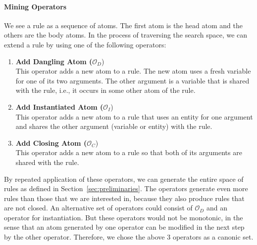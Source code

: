 {{\paragraph{Mining Operators}
We see a rule as a sequence of atoms. The first atom is the head atom and the others are the body atoms. In the process of traversing the search space, we can extend a rule by using one of the following operators:
\begin{enumerate}
\item \textbf{Add Dangling Atom ($\mathcal{O}_D$})\\
This operator adds a new atom to a rule. The new atom uses a fresh variable for one of its two arguments. The other argument is a variable
that is shared with the rule, i.e., it occurs in some other atom of the rule.
\item \textbf{Add Instantiated Atom ($\mathcal{O}_I$})\\
This operator adds a new atom to a rule that uses an entity for one argument and shares the other argument (variable or entity) with the rule.
\item \textbf{Add Closing Atom ($\mathcal{O}_C$})\\
This operator adds a new atom to a rule so that both of its arguments are shared with the rule.
\end{enumerate}
By repeated application of these operators, we can generate the entire space of rules as defined in Section~\ref{sec:preliminaries}.
The operators generate even more rules than those that we are interested in, because they also produce rules that are not closed.
An alternative set of operators could consist of $\mathcal{O}_D$ and an operator for instantiation.
But these operators would not be monotonic, in the sense that an atom generated by one operator can be modified in the next step by the other operator.
Therefore, we chose the above 3 operators as a canonic set.
}


}
